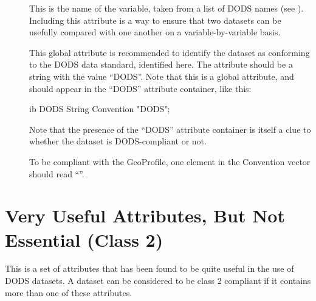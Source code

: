 \begin{description}
\item[] This is the name of the variable, taken from
  a list of DODS names (see ).  Including this
  attribute is a way to ensure that two datasets can be usefully
  compared with one another on a variable-by-variable basis.

\item[] This global attribute is recommended to
  identify the dataset as conforming to the DODS data standard,
  identified here.  The attribute should be a string with the value
  ``DODS''.   Note that this is a global attribute, and should appear
  in the ``DODS'' attribute container, like this:

\begin{vcode}{ib}
DODS {
  String Convention "DODS"; }
\end{vcode}

Note that the presence of the ``DODS'' attribute container is itself
a clue to whether the dataset is DODS-compliant or not.

 To be compliant with the
GeoProfile, one element in the Convention vector should read
``''.

\end{description}

\section{Very Useful Attributes, But Not Essential (Class 2)}

This is a set of attributes that has been found to be quite useful in
the use of DODS datasets.  A dataset can be considered to be class 2
compliant if it contains more than one of these attributes.

